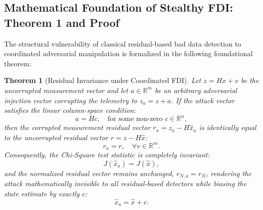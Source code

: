 \documentclass[journal,compsoc]{IEEEtran}
\begin{document}
\subsection{Mathematical Foundation of Stealthy FDI: Theorem 1 and Proof}
The structural vulnerability of classical residual-based bad data detection to coordinated adversarial manipulation is formalized in the following foundational theorem:

\newtheorem{theorem}{Theorem}
\begin{theorem}[Residual Invariance under Coordinated FDI]
Let $z = Hx + v$ be the uncorrupted measurement vector and let $a \in \mathbb{R}^m$ be an arbitrary adversarial injection vector corrupting the telemetry to $z_a = z + a$. If the attack vector satisfies the linear column-space condition:
\begin{equation}
    a = Hc, \quad \text{for some non-zero } c \in \mathbb{R}^n,
\end{equation}
then the corrupted measurement residual vector $r_a = z_a - H\hat{x}_a$ is identically equal to the uncorrupted residual vector $r = z - H\hat{x}$:
\begin{equation}
    r_a = r, \quad \forall v \in \mathbb{R}^m.
\end{equation}
Consequently, the Chi-Square test statistic is completely invariant:
\begin{equation}
    J(\hat{x}_a) = J(\hat{x}),
\end{equation}
and the normalized residual vector remains unchanged, $r_{N,a} = r_N$, rendering the attack mathematically invisible to all residual-based detectors while biasing the state estimate by exactly $c$:
\begin{equation}
    \hat{x}_a = \hat{x} + c.
\end{equation}
\end{theorem}
\end{document}
